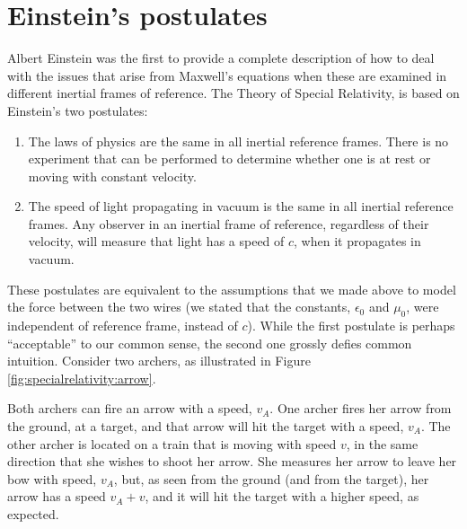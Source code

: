 \section{Einstein's postulates}
Albert Einstein was the first to provide a complete description of how to deal with the issues that arise from Maxwell's equations when these are examined in different inertial frames of reference. The Theory of Special Relativity, is based on Einstein's two postulates:
\begin{enumerate}
\item The laws of physics are the same in all inertial reference frames. There is no experiment that can be performed to determine whether one is at rest or moving with constant velocity.
\item The speed of light propagating in vacuum is the same in all inertial reference frames. Any observer in an inertial frame of reference, regardless of their velocity, will measure that light has a speed of $c$, when it propagates in vacuum. 
\end{enumerate}
These postulates are equivalent to the assumptions that we made above to model the force between the two wires (we stated that the constants, $\epsilon_0$ and $\mu_0$, were independent of reference frame, instead of $c$). While the first postulate is perhaps ``acceptable'' to our common sense, the second one grossly defies common intuition. Consider two archers, as illustrated in Figure \ref{fig:specialrelativity:arrow}.

Both archers can fire an arrow with a speed, $v_A$. One archer fires her arrow from the ground, at a target, and that arrow will hit the target with a speed, $v_A$. The other archer is located on a train that is moving with speed $v$, in the same direction that she wishes to shoot her arrow. She measures her arrow to leave her bow with speed, $v_A$, but, as seen from the ground (and from the target), her arrow has a speed $v_A+v$, and it will hit the target with a higher speed, as expected.

